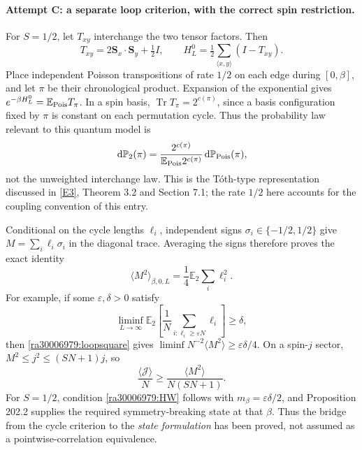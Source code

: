 \documentclass[11pt]{article}
\newcommand{\eps}{\varepsilon}
\newcommand{\dd}{\,\mathrm d}
\newcommand{\eref}[2]{\hyperlink{extra:#1:#2}{[E#2]}}
\begin{document}
	\paragraph{Attempt C: a separate loop criterion, with the correct spin restriction.}
	For $S=1/2$, let $T_{xy}$ interchange the two tensor factors. Then
	\[
	T_{xy}=2\mathbf S_x\cdot\mathbf S_y+\tfrac12I,
	\qquad H_L^0=\tfrac12\sum_{\langle x,y\rangle}(I-T_{xy}).
	\]
	Place independent Poisson transpositions of rate $1/2$ on each edge
	during $[0,\beta]$, and let $\pi$ be their chronological product.
	Expansion of the exponential gives
	$e^{-\beta H_L^0}=\mathbb E_{\rm Pois}T_\pi$.
	In a spin basis, $\operatorname{Tr}T_\pi=2^{c(\pi)}$, since a basis
	configuration fixed by $\pi$ is constant on each permutation cycle.
	Thus the probability law relevant to this quantum model is
	\begin{equation}\label{ra30006979:looplaw}
		\dd\mathbb P_2(\pi)=
		\frac{2^{c(\pi)}}{\mathbb E_{\rm Pois}2^{c(\pi)}}
		\dd\mathbb P_{\rm Pois}(\pi),
	\end{equation}
	not the unweighted interchange law. This is the T\'oth-type
	representation discussed in \eref{30006979}{3}, Theorem 3.2 and Section 7.1;
	the rate $1/2$ here accounts for the coupling convention of this entry.
	
	Conditional on the cycle lengths $\ell_i$, independent signs
	$\sigma_i\in\{-1/2,1/2\}$ give
	$M=\sum_i\ell_i\sigma_i$ in the diagonal trace. Averaging the signs
	therefore proves the exact identity
	\begin{equation}\label{ra30006979:loopsquare}
		\langle M^2\rangle_{\beta,0,L}
		=\frac14\mathbb E_2\sum_i\ell_i^2.
	\end{equation}
	For example, if some $\eps,\delta>0$ satisfy
	\begin{equation}\label{ra30006979:loopgoal}
		\liminf_{L\to\infty}\mathbb E_2
		\left[\frac1N\sum_{i:\ell_i\geq\eps N}\ell_i\right]\geq\delta,
	\end{equation}
	then \eqref{ra30006979:loopsquare} gives
	$\liminf N^{-2}\langle M^2\rangle\geq\eps\delta/4$.
	On a spin-$j$ sector, $M^2\leq j^2\leq(SN+1)j$, so
	\[
	\frac{\langle\mathcal J\rangle}{N}
	\geq\frac{\langle M^2\rangle}{N(SN+1)}.
	\]
	For $S=1/2$, condition \eqref{ra30006979:HW} follows with
	$m_\beta=\eps\delta/2$, and Proposition 202.2 supplies the required
	symmetry-breaking state at that $\beta$. Thus the bridge from the
	cycle criterion to the \emph{state formulation} has been proved, not
	assumed as a pointwise-correlation equivalence.
	
\end{document}
